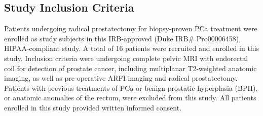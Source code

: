 \subsection{Study Inclusion Criteria}
Patients undergoing radical prostatectomy for biopsy-proven PCa treatment were
enrolled as study subjects in this IRB-approved (Duke IRB\# Pro00006458),
HIPAA-compliant study.  A total of 16 patients were recruited and enrolled in
this study.  Inclusion criteria were undergoing complete pelvic MRI with
endorectal coil for detection of prostate cancer, including multiplanar
T2-weighted anatomic imaging, as well as pre-operative ARFI imaging and radical
prostatectomy.  Patients with previous treatments of PCa or benign prostatic
hyperplasia (BPH), or anatomic anomalies of the rectum, were excluded from this
study.  All patients enrolled in this study provided written informed consent.
